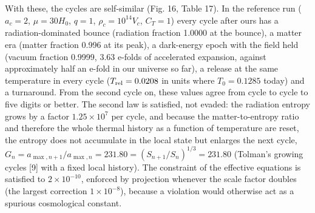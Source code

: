\documentclass[11pt,a4paper]{article}
\begin{document}
With these, the cycles are self-similar (Fig. 16, Table 17). In the reference run ($a_c=2$, $\mu=30H_0$, $q=1$, $\rho_c=10^{14}V_c$, $C_T=1$) every cycle after ours has a radiation-dominated bounce (radiation fraction 1.0000 at the bounce), a matter era (matter fraction 0.996 at its peak), a dark-energy epoch with the field held (vacuum fraction 0.9999, 3.63 e-folds of accelerated expansion, against approximately half an e-fold in our universe so far), a release at the same temperature in every cycle ($T_{\rm rel}=0.0208$ in units where $T_0=0.1285$ today) and a turnaround. From the second cycle on, these values agree from cycle to cycle to five digits or better. The second law is satisfied, not evaded: the radiation entropy grows by a factor $1.25\times10^{7}$ per cycle, and because the matter-to-entropy ratio and therefore the whole thermal history as a function of temperature are reset, the entropy does not accumulate in the local state but enlarges the next cycle, $G_n=a_{\max,n+1}/a_{\max,n}=231.80=(S_{n+1}/S_n)^{1/3}=231.80$ (Tolman's growing cycles [9] with a fixed local history). The constraint of the effective equations is satisfied to $2\times10^{-10}$, enforced by projection whenever the scale factor doubles (the largest correction $1\times10^{-8}$), because a violation would otherwise act as a spurious cosmological constant.
\end{document}
